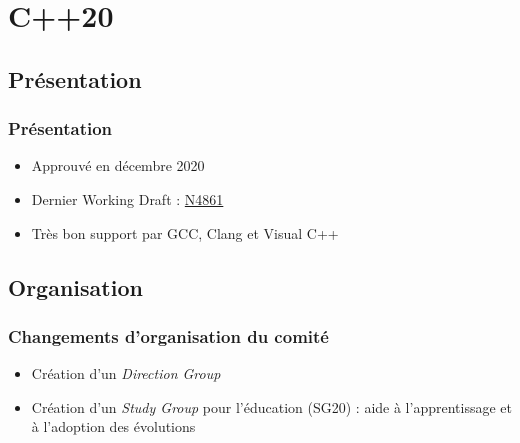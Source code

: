 \documentclass[C++.tex]{subfiles}
\begin{document}
\section{C++20}
\subsection*{Présentation}
\begin{frame}
	\frametitle{Présentation}
	\begin{itemize}
		\item Approuvé en décembre 2020
		\item Dernier Working Draft : \href{https://github.com/cplusplus/draft/releases/download/n4861/n4861.pdf}{N4861}
		\item Très bon support par GCC, Clang et Visual C++
	\end{itemize}
\end{frame}

\subsection*{Organisation}
\begin{frame}
	\frametitle{Changements d'organisation du comité}
	\begin{itemize}
		\item Création d'un \textit{Direction Group}
		\item Création d'un \textit{Study Group} pour l'éducation (SG20) : aide à l'apprentissage et à l'adoption des évolutions
	\end{itemize}

	\centering
\end{frame}
\end{document}
